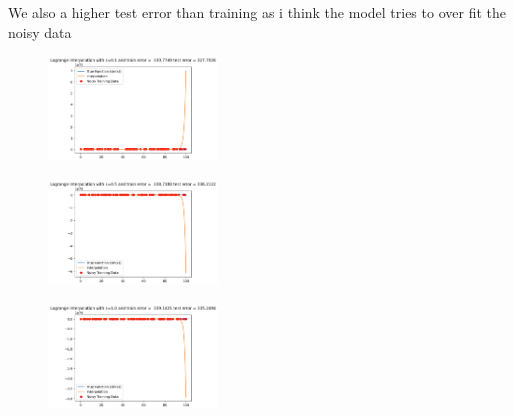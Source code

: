 \documentclass[a4paper]{article}
\theoremstyle{definition}
\begin{document}
We also a higher test error than training as i think the model tries to over fit the noisy data
\begin{figure}[H]
	\centering
	\includegraphics[width=0.4\textwidth]{q91.png}  
	\captionsetup{labelformat=empty}
	\caption{}
	\label{fig:my_label}
\end{figure}
\begin{figure}[H]
	\centering
	\includegraphics[width=0.4\textwidth]{q92.png}  
	\captionsetup{labelformat=empty}
	\caption{}
	\label{fig:my_label}
\end{figure}
\begin{figure}[H]
	\centering
	\includegraphics[width=0.4\textwidth]{q93.png}  
	\captionsetup{labelformat=empty}
	\caption{}
	\label{fig:my_label}
\end{figure}





\end{document}
